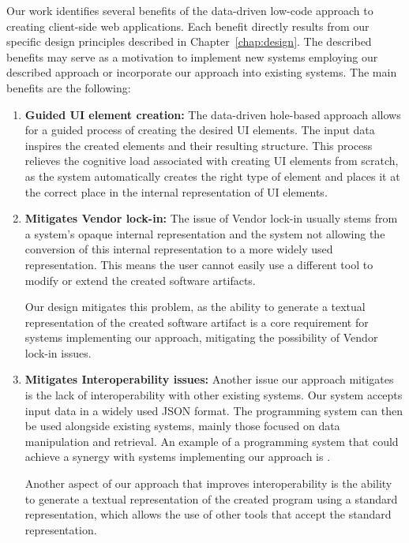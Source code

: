 Our work identifies several benefits of the data-driven low-code approach to creating client-side web applications.
Each benefit directly results from our specific design principles described in Chapter~\ref{chap:design}.
The described benefits may serve as a motivation to implement new systems employing our described approach or incorporate our approach into existing systems.
The main benefits are the following:
\begin{enumerate}
	\item \textbf{Guided UI element creation:} The data-driven hole-based approach allows for a guided process of creating the desired UI elements.
	      The input data inspires the created elements and their resulting structure.
	      This process relieves the cognitive load associated with creating UI elements from scratch, as the system automatically creates the right type
	      of element and places it at the correct place in the internal representation of UI elements.

	\item \textbf{Mitigates Vendor lock-in:} The issue of Vendor lock-in usually stems from a system's opaque internal representation
	      and the system not allowing the conversion of this internal representation to a more widely used representation.
	      This means the user cannot easily use a different tool to modify or extend the created software artifacts.

	      Our design mitigates this problem, as the ability to generate a textual representation of the created software artifact is a core requirement
	      for systems implementing our approach, mitigating the possibility of Vendor lock-in issues.

	\item \textbf{Mitigates Interoperability issues:}
	      Another issue our approach mitigates is the lack of interoperability with other existing systems.
	      Our system accepts input data in a widely used JSON format.
	      The programming system can then be used alongside existing systems, mainly those focused on data manipulation and retrieval.
	      An example of a programming system that could achieve a synergy with systems implementing our approach is \citet{graphql}.

	      Another aspect of our approach that improves interoperability is the ability to generate a textual representation of the created program using a standard representation, which allows the use of other tools that accept the standard representation.
\end{enumerate}



